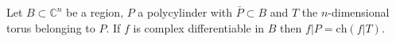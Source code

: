 Let $B \subset \mathbb{C}^n$ be a region, $P$ a polycylinder with $\bar{P} \subset B$ and $T$ the $n$-dimensional torus belonging to $P$. If $f$ is complex differentiable in $B$ then $f|P = \text{ch}(f|T)$.
